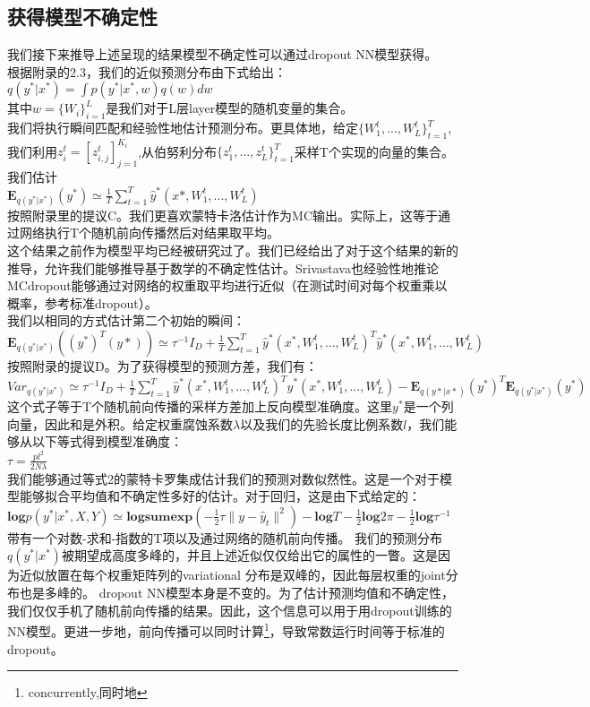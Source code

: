\documentclass[2pt,a4paper]{article}
\begin{document}
\subsection{获得模型不确定性}
我们接下来推导上述呈现的结果模型不确定性可以通过dropout NN模型获得。\\
根据附录的2.3，我们的近似预测分布由下式给出：\\
$q(y^*|x^*)=\int p(y^*|x^*,w)q(w)dw$\\
其中$w=\{W_i\}_{i=1}^L$是我们对于L层layer模型的随机变量的集合。\\
我们将执行瞬间匹配和经验性地估计预测分布。更具体地，给定$\{W_1^t,...,W_L^t\}_{t=1}^T$,我们利用$z_i^t=[z_{i,j}^t]_{j=1}^{K_i}$,从伯努利分布$\{z_1^t,...,z_L^t\}_{t=1}^T$采样T个实现的向量的集合。我们估计\\
$ \mathbf{E}_{q(y^*|x^*)}(y^*) \simeq \frac{1}{T} \sum _{t=1}^T \hat{y}^*(x*,W_1^t,...,W_L^t) $\\
按照附录里的提议C。我们更喜欢蒙特卡洛估计作为MC输出。实际上，这等于通过网络执行T个随机前向传播然后对结果取平均。\\
这个结果之前作为模型平均已经被研究过了。我们已经给出了对于这个结果的新的推导，允许我们能够推导基于数学的不确定性估计。Srivastava也经验性地推论MCdropout能够通过对网络的权重取平均进行近似（在测试时间对每个权重乘以概率，参考标准dropout）。\\
我们以相同的方式估计第二个初始的瞬间：\\
$ \mathbf{E}_{q(y^*|x^*)}((y^*)^T(y*)) \simeq \tau^{-1}I_D+ \frac{1}{T} \sum _{t=1}^T \hat{y}^*(x^*,W_1^t,...,W_L^t)^T\hat{y}^*(x^*,W_1^t,...,W_L^t) $\\
按照附录的提议D。为了获得模型的预测方差，我们有：
$ Var_{q(y^*|x^*)} \simeq \tau^{-1}I_D+\frac{1}{T} \sum _{t=1}^T \hat{y}^*(x^*,W_1^t,...,W_L^t)^T\hat{y}^*(x^*,W_1^t,...,W_L^t)-\mathbf{E}_{q(y*|x*)}(y^*)^T\mathbf{E}_{q(y^*|x^*)}(y^*) $\\
这个式子等于T个随机前向传播的采样方差加上反向模型准确度。这里$y^*$是一个列向量，因此和是外积。给定权重腐蚀系数$\lambda$以及我们的先验长度比例系数$l$，我们能够从以下等式得到模型准确度：\\
$\tau=\frac{pl^2}{2N\lambda}$\\
我们能够通过等式2的蒙特卡罗集成估计我们的预测对数似然性。这是一个对于模型能够拟合平均值和不确定性多好的估计。对于回归，这是由下式给定的：\\
$\mathbf{log}p(y^*|x^*,X,Y) \simeq \mathbf{logsumexp}(-\frac{1}{2}\tau \parallel y-\hat{y}_t \parallel ^2)- \mathbf{log}T-\frac{1}{2}\mathbf{log}2\pi-\frac{1}{2}\mathbf{log}\tau^{-1}$\\
带有一个对数-求和-指数的T项以及通过网络的随机前向传播。
我们的预测分布$q(y^*|x^*)$被期望成高度多峰的，并且上述近似仅仅给出它的属性的一瞥。这是因为近似放置在每个权重矩阵列的variational 分布是双峰的，因此每层权重的joint分布也是多峰的。
dropout NN模型本身是不变的。为了估计预测均值和不确定性，我们仅仅手机了随机前向传播的结果。因此，这个信息可以用于用dropout训练的NN模型。更进一步地，前向传播可以同时计算\footnote{concurrently,同时地}，导致常数运行时间等于标准的dropout。
\end{document}
